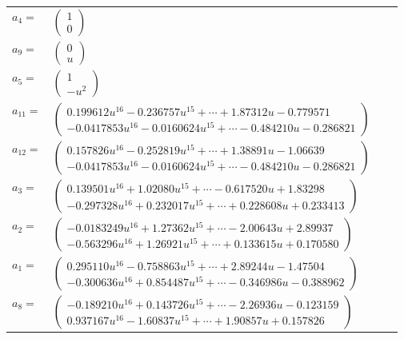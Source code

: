 \documentclass[1p]{elsarticle_modified}
\theoremstyle{definition}
\begin{document}
\begin{tabular}{m{7pt} m{180pt} m{7pt} m{180pt} }
\flushright $a_{4}=$&$\begin{pmatrix}1\\0\end{pmatrix}$ \\
\flushright $a_{9}=$&$\begin{pmatrix}0\\u\end{pmatrix}$ \\
\flushright $a_{5}=$&$\begin{pmatrix}1\\- u^2\end{pmatrix}$ \\
\flushright $a_{11}=$&$\begin{pmatrix}0.199612 u^{16}-0.236757 u^{15}+\cdots+1.87312 u-0.779571\\-0.0417853 u^{16}-0.0160624 u^{15}+\cdots-0.484210 u-0.286821\end{pmatrix}$ \\
\flushright $a_{12}=$&$\begin{pmatrix}0.157826 u^{16}-0.252819 u^{15}+\cdots+1.38891 u-1.06639\\-0.0417853 u^{16}-0.0160624 u^{15}+\cdots-0.484210 u-0.286821\end{pmatrix}$ \\
\flushright $a_{3}=$&$\begin{pmatrix}0.139501 u^{16}+1.02080 u^{15}+\cdots-0.617520 u+1.83298\\-0.297328 u^{16}+0.232017 u^{15}+\cdots+0.228608 u+0.233413\end{pmatrix}$ \\
\flushright $a_{2}=$&$\begin{pmatrix}-0.0183249 u^{16}+1.27362 u^{15}+\cdots-2.00643 u+2.89937\\-0.563296 u^{16}+1.26921 u^{15}+\cdots+0.133615 u+0.170580\end{pmatrix}$ \\
\flushright $a_{1}=$&$\begin{pmatrix}0.295110 u^{16}-0.758863 u^{15}+\cdots+2.89244 u-1.47504\\-0.300636 u^{16}+0.854487 u^{15}+\cdots-0.346986 u-0.388962\end{pmatrix}$ \\
\flushright $a_{8}=$&$\begin{pmatrix}-0.189210 u^{16}+0.143726 u^{15}+\cdots-2.26936 u-0.123159\\0.937167 u^{16}-1.60837 u^{15}+\cdots+1.90857 u+0.157826\end{pmatrix}$ \\

\end{tabular}
\end{document}

